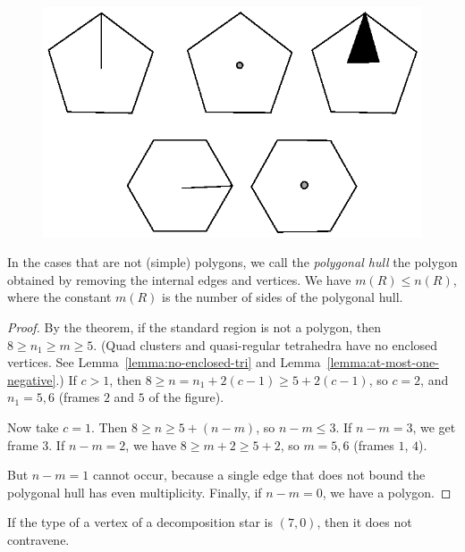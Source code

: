 \begin{figure}[htb]
  \centering
  \includegraphics{PS/diag7.1.ps}
  \caption{}
  \label{fig:std-aggregates}
\end{figure}


In the cases that are not (simple) polygons, we call the {\it polygonal
hull\/} the polygon obtained by removing the internal edges and
vertices. We have $m(R)\le n(R)$, where the constant $m(R)$ is the
number of sides of the polygonal hull.

\begin{proof}
By the theorem, if the standard region is not a polygon, then $8\ge
n_1\ge m\ge 5$. (Quad clusters and quasi-regular tetrahedra have no
enclosed vertices. See Lemma~\ref{lemma:no-enclosed-tri} and
Lemma~\ref{lemma:at-most-one-negative}.) If $c>1$, then $8\ge
n=n_1+2(c-1)\ge 5+2(c-1)$, so $c=2$, and $n_1=5,6$ (frames $2$ and $5$
of the figure).

Now take $c=1$.    Then $8\ge n\ge 5+(n-m)$, so $n-m\le 3$.  If $n-m=3$,
we get frame $3$. If $n-m=2$, we have $8\ge m+2\ge 5+2$, so $m=5,6$
(frames $1$, $4$).

But $n-m=1$ cannot occur, because a single edge that does not bound the
polygonal hull has even multiplicity.  Finally, if $n-m=0$, we have a
polygon.
\end{proof}

\begin{corollary} \label{lemma:70}
If the type of a vertex of a decomposition star is $(7,0)$, then
it does not contravene.
\end{corollary}

